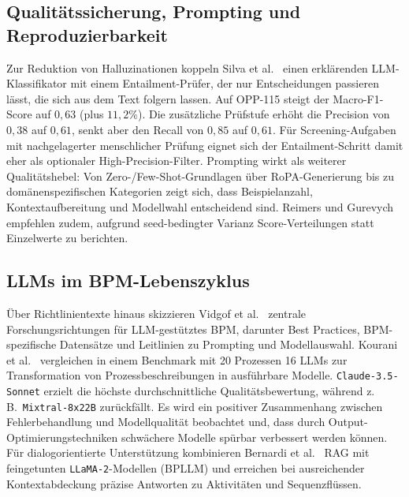 \subsection*{Qualitätssicherung, Prompting und Reproduzierbarkeit}

Zur Reduktion von Halluzinationen koppeln Silva et al.\ \cite{silva2024entailment} einen erklärenden \ac{LLM}-Klassifikator mit einem Entailment-Prüfer, der nur Entscheidungen passieren lässt, die sich aus dem Text folgern lassen. Auf OPP-115 steigt der Macro-F1-Score auf $0{,}63$ (plus $11{,}2$\%). Die zusätzliche Prüfstufe erhöht die Precision von $0{,}38$ auf $0{,}61$, senkt aber den Recall von $0{,}85$ auf $0{,}61$. Für Screening-Aufgaben mit nachgelagerter menschlicher Prüfung eignet sich der Entailment-Schritt damit eher als optionaler High-Precision-Filter. Prompting wirkt als weiterer Qualitätshebel: Von Zero-/Few-Shot-Grundlagen \cite{brown2020fewshot,liu2023prompting} über RoPA-Generierung \cite{pragyan2024toward} bis zu domänenspezifischen Kategorien \cite{schwerin2024systematic} zeigt sich, dass Beispielanzahl, Kontextaufbereitung und Modellwahl entscheidend sind. Reimers und Gurevych \cite{reimers2017reporting} empfehlen zudem, aufgrund seed-bedingter Varianz Score-Verteilungen statt Einzelwerte zu berichten.

\subsection*{\acp{LLM} im BPM-Lebenszyklus}

Über Richtlinientexte hinaus skizzieren Vidgof et al.\ \cite{vidgof2023largelanguagemodelsbusiness} zentrale Forschungsrichtungen für \ac{LLM}-gestütztes \ac{BPM}, darunter Best Practices, \ac{BPM}-spezifische Datensätze und Leitlinien zu Prompting und Modellauswahl. Kourani et al.\ \cite{kourani2025evaluating} vergleichen in einem Benchmark mit 20 Prozessen 16 \acp{LLM} zur Transformation von Prozessbeschreibungen in ausführbare Modelle. \texttt{Claude-3.5-Sonnet} erzielt die höchste durchschnittliche Qualitätsbewertung, während z.\,B.\ \texttt{Mixtral-8x22B} zurückfällt. Es wird ein positiver Zusammenhang zwischen Fehlerbehandlung und Modellqualität beobachtet und, dass durch Output-Optimierungstechniken schwächere Modelle spürbar verbessert werden können. Für dialogorientierte Unterstützung kombinieren Bernardi et al.\ \cite{bernardi2024conversing} \ac{RAG} mit feingetunten \texttt{LLaMA-2}-Modellen (BPLLM) und erreichen bei ausreichender Kontextabdeckung präzise Antworten zu Aktivitäten und Sequenzflüssen.


